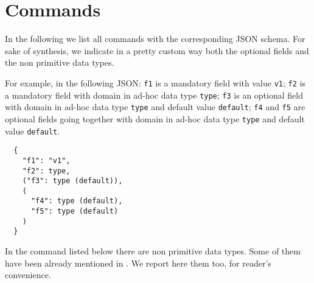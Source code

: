 \section{Commands}
\label{sec:commands}

In the following we list all commands with the corresponding JSON schema.
For sake of synthesis, we indicate in a pretty custom way both the optional fields and the non primitive data types.

For example, in the following JSON: \texttt{f1} is a mandatory field with value \texttt{v1}; \texttt{f2} is a mandatory field with domain in ad-hoc data type \texttt{type}; \texttt{f3} is an optional field with domain in ad-hoc data type \texttt{type} and default value \texttt{default}; \texttt{f4} and \texttt{f5} are optional fields going together with domain in ad-hoc data type \texttt{type} and default value \texttt{default}.

\begin{verbatim}
  {
    "f1": "v1",
    "f2": type,
    ("f3": type (default)),
    (
      "f4": type (default),
      "f5": type (default)
    )
  }
\end{verbatim}

In the command listed below there are non primitive data types. Some of them have been already mentioned in . We report here them too, for reader's convenience.

